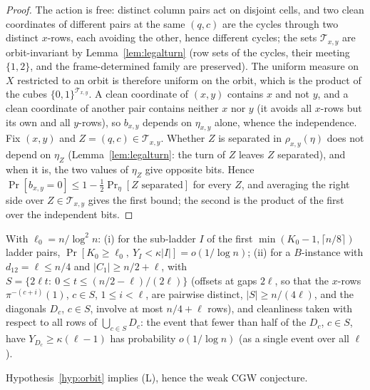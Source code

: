 \begin{proof}
The action is free: distinct column pairs act on disjoint cells, and
two clean coordinates of different pairs at the same $(q,c)$ are the
cycles through two distinct $x$-rows, each avoiding the other, hence
different cycles; the sets $\mathcal T_{x,y}$ are orbit-invariant by
Lemma~\ref{lem:legalturn} (row sets of the cycles, their meeting
$\{1,2\}$, and the frame-determined family are preserved).  The
uniform measure on $X$ restricted to an orbit is therefore uniform on
the orbit, which is the product of the cubes
$\{0,1\}^{\mathcal T_{x,y}}$.  A clean coordinate of $(x,y)$ contains
$x$ and not $y$, and a clean coordinate of another pair contains
neither $x$ nor $y$ (it avoids all $x$-rows but its own and all
$y$-rows), so $b_{x,y}$ depends on $\eta_{x,y}$ alone, whence the
independence.  Fix $(x,y)$ and
$Z=(q,c)\in\mathcal T_{x,y}$.  Whether $Z$ is separated in
$\rho_{x,y}(\eta)$ does not depend on $\eta_Z$
(Lemma~\ref{lem:legalturn}: the turn of $Z$ leaves $Z$ separated), and
when it is, the two values of $\eta_Z$ give opposite bits.  Hence
$\Pr[b_{x,y}=0]\le1-\tfrac12\Pr_\eta[Z\text{ separated}]$ for every
$Z$, and averaging the right side over $Z\in\mathcal T_{x,y}$ gives
the first bound; the second is the product of the first over the
independent bits.
\end{proof}

\begin{hypothesis}\label{hyp:orbit}
With $\ell_0=n/\log^2n$: (i) for the sub-ladder $I$ of the first
$\min(K_0-1,\lceil n/8\rceil)$ ladder pairs,
$\Pr[K_0\ge\ell_0,\ Y_I<\kappa|I|]=o(1/\log n)$; (ii) for a
$B$-instance with $d_{12}=\ell\le n/4$ and $|C_1|\ge n/2+\ell$, with
$S=\{2\ell t:\ 0\le t\le(n/2-\ell)/(2\ell)\}$ (offsets at gaps
$2\ell$, so that the $x$-rows $\pi^{-(c+i)}(1)$, $c\in S$,
$1\le i<\ell$, are pairwise distinct, $|S|\ge n/(4\ell)$, and the
diagonals $D_c$, $c\in S$, involve at most $n/4+\ell$ rows), and
cleanliness taken with respect to all rows of
$\bigcup_{c\in S}D_c$: the event that fewer than half of the $D_c$,
$c\in S$, have $Y_{D_c}\ge\kappa(\ell-1)$ has probability
$o(1/\log n)$ (as a single event over all $\ell$).
\end{hypothesis}

\begin{proposition}\label{prop:Lorbit}
Hypothesis~\ref{hyp:orbit} implies \textup{(L)}, hence the weak CGW
conjecture.
\end{proposition}


